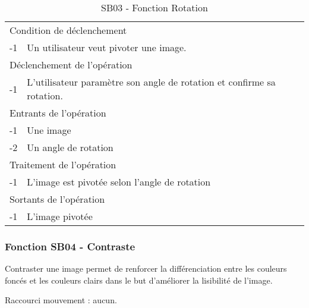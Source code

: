 \documentclass[a4paper]{article}
\begin{document}
\begin{table}[H]
  \centering
   \small
	\begin{tabular}{|c|p{12cm}|}
   		\hline
   			\rowcolor{lightgray}\multicolumn{2}{|c|}{\textbf{SB03 - Fonction Rotation}} \\
   		\hline
   			\multicolumn{2}{|l|}{Condition de d\'eclenchement} \\
   		\hline
   			-1 & Un utilisateur veut pivoter une image. \\
   		\hline
   			\multicolumn{2}{|l|}{D\'eclenchement de l'op\'eration} \\
   		\hline
   			-1 & L'utilisateur paramètre son angle de rotation et confirme sa rotation. \\
   		\hline
   			\multicolumn{2}{|l|}{Entrants de l'op\'eration} \\
   		\hline
        	-1 & Une image \\
   			-2 & Un angle de rotation \\ 	
        \hline
   			\multicolumn{2}{|l|}{Traitement de l'op\'eration} \\
  		\hline
   			-1 & L'image est pivotée selon l'angle de rotation \\
   		\hline
   			\multicolumn{2}{|l|}{Sortants de l'op\'eration} \\
   		\hline
   			-1 & L'image pivotée \\
   		\hline
	\end{tabular}
  \caption{SB03 - Fonction Rotation}
  \normalsize
  \label{tab:visu_img_rotation}
\end{table}


\subsubsection{Fonction SB04 - Contraste}

Contraster une image permet de renforcer la différenciation entre les couleurs foncés et les couleurs clairs dans le but d'améliorer la lisibilité de l'image.

Raccourci mouvement : aucun.
\end{document}
